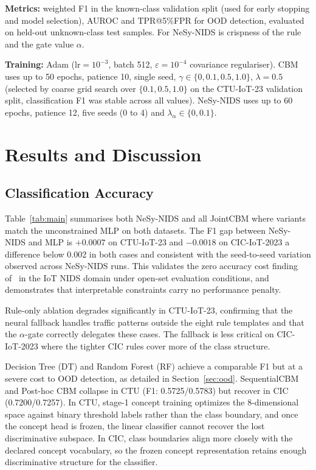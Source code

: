 \documentclass[journal]{IEEEtran}
\begin{document}
\textbf{Metrics:} weighted F1 in the known-class validation split (used for early stopping and model selection), AUROC and TPR@5\%FPR for OOD detection, evaluated on held-out unknown-class test samples. For
NeSy-NIDS is crispness of the rule and the gate value $\alpha$.

\textbf{Training:} Adam ($\mathrm{lr}{=}10^{-3}$, batch 512, $\varepsilon{=}10^{-4}$ covariance regulariser). CBM uses up to 50 epochs, patience 10, single seed, $\gamma\in\{0,0.1,0.5,1.0\}$, $\lambda{=}0.5$ (selected by coarse grid search over $\{0.1,0.5,1.0\}$ on the CTU-IoT-23 validation split, classification F1 was stable across all values). NeSy-NIDS uses up to 60 epochs, patience 12, five seeds (0 to 4) and  $\lambda_\alpha\in\{0,0.1\}$.

\section{Results and Discussion}

\subsection{Classification Accuracy}

\begin{sloppypar}
Table~\ref{tab:main} summarises  both NeSy-NIDS and all JointCBM  where variants match the unconstrained MLP on both datasets. The F1 gap between NeSy-NIDS and MLP is $+0.0007$ on CTU-IoT-23 and $-0.0018$ on CIC-IoT-2023 a  difference below 0.002 in both cases and consistent with the seed-to-seed variation observed across NeSy-NIDS runs. This validates the zero accuracy cost finding of~\cite{koh2020concept} in the IoT NIDS domain under open-set evaluation conditions, and demonstrates that interpretable constraints carry no performance penalty.
\end{sloppypar}

Rule-only ablation degrades significantly in CTU-IoT-23, confirming that the neural fallback handles traffic patterns outside the eight rule templates and that the $\alpha$-gate correctly delegates these cases. The fallback is less critical on CIC-IoT-2023 where the tighter CIC rules cover more of the class structure.

Decision Tree (DT) and Random Forest (RF) achieve a comparable F1 but at a severe cost to OOD detection, as detailed in Section~\ref{sec:ood}. SequentialCBM and Post-hoc CBM collapse in CTU (F1: 0.5725/0.5783) but recover in CIC (0.7200/0.7257). In CTU, stage-1 concept training optimizes the 8-dimensional space against binary threshold labels rather than the class boundary, and once the concept head is frozen, the linear classifier cannot recover the lost discriminative subspace. In CIC, class boundaries align more closely with the declared concept vocabulary, so the frozen concept representation retains enough discriminative structure for the classifier.
\end{document}
